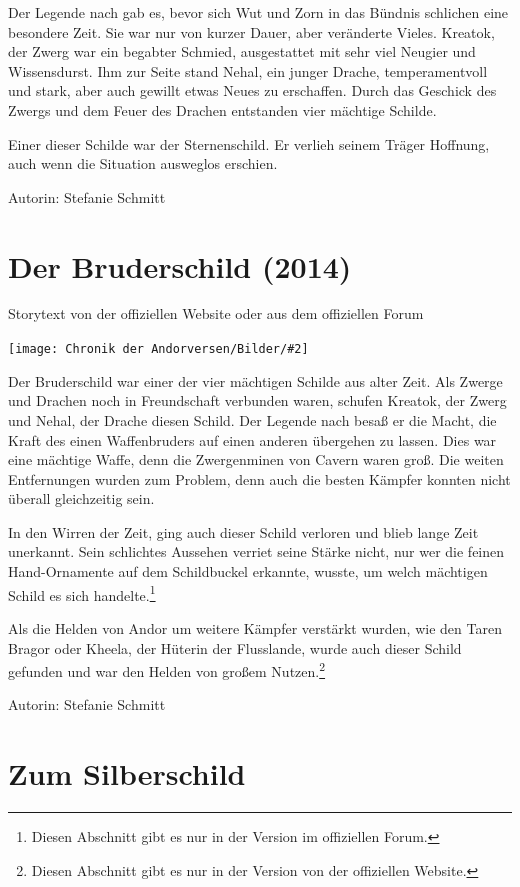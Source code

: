 \documentclass[10pt, a4paper, oneside]{book}
\newcommand{\fillbreak}{\vspace*{\fill}\columnbreak}
\newcommand{\storytext}[1]{%
    \section{#1}%
    \label{Storytext: #1}%
}
\newcommand{\bildmitts}[2][height=0.32\textwidth,width=0.48\textwidth,keepaspectratio]{%
    \begin{center}
        \texttt{[image: Chronik der Andorversen/Bilder/\#2]}
    \end{center}
}
\begin{document}
\begin{multicols}{2}
Der Legende nach gab es, bevor sich Wut und Zorn in das Bündnis schlichen eine besondere Zeit. Sie war nur von kurzer Dauer, aber veränderte Vieles. Kreatok, der Zwerg war ein begabter Schmied, ausgestattet mit sehr viel Neugier und Wissensdurst. Ihm zur Seite stand Nehal, ein junger Drache, temperamentvoll und stark, aber auch gewillt etwas Neues zu erschaffen. Durch das Geschick des Zwergs und dem Feuer des Drachen entstanden vier mächtige Schilde.\bigskip

Einer dieser Schilde war der Sternenschild. Er verlieh seinem Träger Hoffnung, auch wenn die Situation ausweglos erschien.\bigskip

Autorin: Stefanie Schmitt





\fillbreak
\storytext{Der Bruderschild (2014)}

\begin{center}
    Storytext von der offiziellen Website oder aus dem offiziellen Forum
\end{center}

\bildmitts{Der Bruderschild Bild 1.jpg}

Der Bruderschild war einer der vier mächtigen Schilde aus alter Zeit. Als Zwerge und Drachen noch in Freundschaft verbunden waren, schufen Kreatok, der Zwerg und Nehal, der Drache diesen Schild. Der Legende nach besaß er die Macht, die Kraft des einen Waffenbruders auf einen anderen übergehen zu lassen. Dies war eine mächtige Waffe, denn die Zwergenminen von Cavern waren groß. Die weiten Entfernungen wurden zum Problem, denn auch die besten Kämpfer konnten nicht überall gleichzeitig sein.

In den Wirren der Zeit, ging auch dieser Schild verloren und blieb lange Zeit unerkannt. Sein schlichtes Aussehen verriet seine Stärke nicht, nur wer die feinen Hand-Ornamente auf dem Schildbuckel erkannte, wusste, um welch mächtigen Schild es sich handelte.\footnote{Diesen Abschnitt gibt es nur in der Version im offiziellen Forum.}

Als die Helden von Andor um weitere Kämpfer verstärkt wurden, wie den Taren Bragor oder Kheela, der Hüterin der Flusslande, wurde auch dieser Schild gefunden und war den Helden von großem Nutzen.\footnote{Diesen Abschnitt gibt es nur in der Version von der offiziellen Website.}\bigskip

Autorin: Stefanie Schmitt



\fillbreak
\storytext{Zum Silberschild}


\end{multicols}
\end{document}
